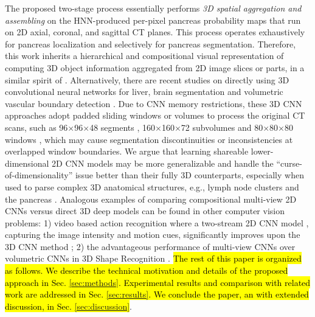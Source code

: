 \documentclass[journal]{IEEEtran}
\begin{document}
The proposed two-stage process essentially performs {\em 3D spatial aggregation and assembling} on the HNN-produced per-pixel pancreas probability maps that run on 2D axial, coronal, and sagittal CT planes. This process operates exhaustively for pancreas localization and selectively for pancreas segmentation. Therefore, this work inherits a hierarchical and compositional visual representation of computing 3D object information aggregated from 2D image slices or parts, in a similar spirit of \cite{roth2014new,Farabet2013Learning,Lu2008Accurate}. Alternatively, there are recent studies on directly using 3D convolutional neural networks for liver, brain segmentation \cite{Dou20163D,Chen2016VoxResNet} and volumetric vascular boundary detection \cite{Merkow2016Dense}. Due to CNN memory restrictions, these 3D CNN approaches adopt padded sliding windows or volumes to process the original CT scans, such as 96$\times$96$\times$48 segments \cite{Merkow2016Dense}, 160$\times$160$\times$72 subvolumes \cite{Dou20163D} and 80$\times$80$\times$80 windows \cite{Chen2016VoxResNet}, which may cause  segmentation discontinuities or inconsistencies at overlapped window boundaries. We argue that learning shareable lower-dimensional 2D CNN models may be more generalizable and handle the ``curse-of-dimensionality'' issue better than their fully 3D counterparts, especially when used to parse complex 3D anatomical structures, e.g., lymph node clusters \cite{Nogues2016LNC,roth2016improving} and the pancreas \cite{roth2015deeporgan,roth2016spatial}. 
Analogous examples of comparing compositional multi-view 2D CNNs versus direct 3D deep models can be found in other computer vision problems: 1) video based action recognition where a two-stream 2D CNN model \cite{Simonyan2014Two}, capturing the image intensity and motion cues, significantly improves upon the 3D CNN method \cite{Karpathy2014Large}; 2) the advantageous performance of multi-view CNNs over volumetric CNNs in 3D Shape Recognition \cite{Su2015Multi}. 
\hl{The rest of this paper is organized as follows. We describe the technical motivation and details of the proposed approach in Sec. \ref{sec:methods}. Experimental results and comparison with related work are addressed in Sec. \ref{sec:results}. We conclude the paper, an with extended discussion, in Sec. \ref{sec:discussion}}.
\end{document}
